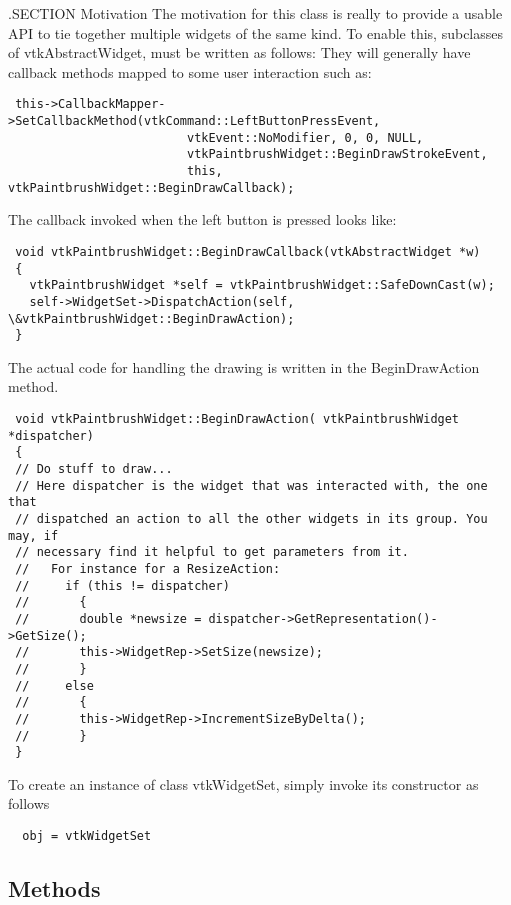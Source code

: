  .SECTION Motivation
 The motivation for this class is really to provide a usable API to tie 
 together multiple widgets of the same kind. To enable this, subclasses
 of vtkAbstractWidget, must be written as follows:
   They will generally have callback methods mapped to some user 
 interaction such as:
 \begin{verbatim}
 this->CallbackMapper->SetCallbackMethod(vtkCommand::LeftButtonPressEvent,
                         vtkEvent::NoModifier, 0, 0, NULL, 
                         vtkPaintbrushWidget::BeginDrawStrokeEvent,
                         this, vtkPaintbrushWidget::BeginDrawCallback);
 \end{verbatim}
   The callback invoked when the left button is pressed looks like: 
 \begin{verbatim}
 void vtkPaintbrushWidget::BeginDrawCallback(vtkAbstractWidget *w)
 {
   vtkPaintbrushWidget *self = vtkPaintbrushWidget::SafeDownCast(w);
   self->WidgetSet->DispatchAction(self, \&vtkPaintbrushWidget::BeginDrawAction);
 }
 \end{verbatim}
   The actual code for handling the drawing is written in the BeginDrawAction 
 method.
 \begin{verbatim}
 void vtkPaintbrushWidget::BeginDrawAction( vtkPaintbrushWidget *dispatcher)
 {
 // Do stuff to draw... 
 // Here dispatcher is the widget that was interacted with, the one that
 // dispatched an action to all the other widgets in its group. You may, if
 // necessary find it helpful to get parameters from it.
 //   For instance for a ResizeAction:
 //     if (this != dispatcher)
 //       {
 //       double *newsize = dispatcher->GetRepresentation()->GetSize();
 //       this->WidgetRep->SetSize(newsize);
 //       }
 //     else
 //       {
 //       this->WidgetRep->IncrementSizeByDelta();
 //       }
 }
 \end{verbatim}
 

To create an instance of class vtkWidgetSet, simply
invoke its constructor as follows
\begin{verbatim}
  obj = vtkWidgetSet
\end{verbatim}
\subsection{Methods}

